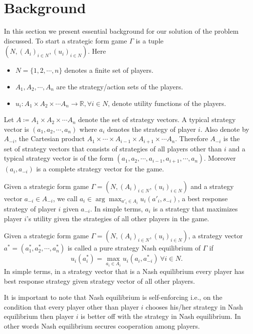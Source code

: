 \section{Background}

In this section we present essential background \cite{YN} for our solution of the problem discussed.
To start a strategic form game $\Gamma$ is a tuple $(N, (A_i)_{i \in N}, (u_i)_{i \in N})$. Here 
\begin{itemize}
    \item $N=\{1,2,\cdots,n\}$ denotes a finite set of players. 
    \item $A_{1},A_{2},\cdots,A_{n}$ are the strategy/action sets of the players. 
    \item $u_{i}:A_{1} \times A_{2}\times \cdots A_{n} \rightarrow \mathbb{R}, \forall i \in N$, denote utility functions of the players. 
\end{itemize}
Let $A \coloneqq A_{1} \times A_{2}\times \cdots A_{n}$ denote the set of strategy vectors. A typical strategy vector is $(a_{1},a_{2},\cdots,a_{n})$ where $a_{i}$ denotes the strategy of player $i.$ Also denote by $A_{-i}$, the Cartesian product $A_{1} \times \cdots \times A_{i-1} \times A_{i+1} \times \cdots A_{n}$. Therefore $A_{-i}$ is the set of strategy vectors that consists of strategies of all players other than $i$ and a typical strategy vector is of the form $(a_{1},a_{2},\cdots,a_{i-1},a_{i+1},\cdots,a_{n})$. Moreover $(a_{i},a_{-i})$ is a complete strategy vector for the game.
\par
Given a strategic form game $\Gamma=(N, (A_i)_{i \in N}, (u_i)_{i \in N})$ and a strategy vector $a_{-i} \in A_{-i}$, we call $a_{i} \in \arg\max_{a'_{i} \in A_{i}} u_{i}(a'_{i},s_{-i})$, a best response strategy of player $i$ given $a_{-i}.$ In simple terms, $a_{i}$ is a strategy that maximizes player $i$'s utility given the strategies of all other players in the game.
\par
Given a strategic form game $\Gamma=(N, (A_i)_{i \in N}, (u_i)_{i \in N})$, a strategy vector $a^{*}=(a^{*}_{1},a^{*}_{2},\cdots,a^{*}_{n})$ is called a pure strategy Nash equilibrium of $\Gamma$ if 
$$u_{i}(a^{*}_{i})=\max_{a_{i}\in A_{i}}u_{i}(a_{i},a^{*}_{-i}) ~ \forall i \in N.$$
In simple terms, in a strategy vector that is a Nash equilibrium every player has best response strategy given strategy vector of all other players.

It is important to note that Nash equilibrium is self-enforcing i.e., on the condition that every player other than player $i$ chooses his/her strategy in Nash equilibrium then player $i$ is better off with the strategy in Nash equilibrium. In other words Nash equilibrium secures cooperation among players.

